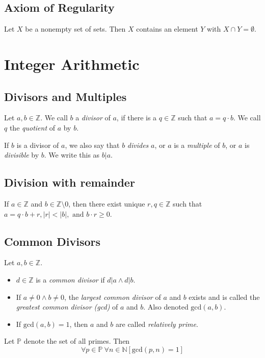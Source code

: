 \documentclass[fleqn]{article}
\begin{document}
\subsection{Axiom of Regularity}
Let $X$ be a nonempty set of sets. Then $X$ contains an element $Y$ with $X \cap Y = \emptyset$.

\section{Integer Arithmetic}
\subsection{Divisors and Multiples}
Let $a,b \in \mathbb{Z}$. We call $b$ a \textit{divisor} of $a$, if there is a $q \in \mathbb{Z}$
such that $a = q \cdot b$. We call $q$ the \textit{quotient} of $a$ by $b$.

If $b$ is a divisor of $a$, we also say that $b$ \textit{divides} $a$, or $a$ is
a \textit{multiple} of $b$, or $a$ is \textit{divisible} by $b$. We write this as $b | a$.

\subsection{Division with remainder}
If $a \in \mathbb{Z}$ and $b \in \mathbb{Z}\setminus{0}$, then there exist
unique $r,q \in \mathbb{Z}$ such that $a = q \cdot b + r, |r| < |b|, \text{ and } b \cdot r \geq 0$.

\subsection{Common Divisors}
Let $a,b \in \mathbb{Z}$.
\begin{itemize}
    \item $d \in \mathbb{Z}$ is a \textit{common divisor} if $d|a \land d|b$.
    \item If $a \neq 0 \land b \neq 0$, the \textit{largest common divisor} of 
        $a$ and $b$ exists and is called the \textit{greatest common divisor (gcd)} of $a$ and $b$.
        Also denoted $\text{gcd}(a,b)$.
    \item If $\text{gcd}(a,b) = 1$, then $a$ and $b$ are called \textit{relatively prime}. 
\end{itemize}

Let $\mathbb{P}$ denote the set of all primes. Then
\begin{equation*}
    \forall p \in \mathbb{P}\ \forall n \in \mathbb{N} \left[ \text{gcd}(p,n) = 1 \right]
\end{equation*}
\end{document}
